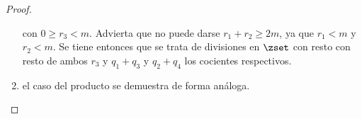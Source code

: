 \begin{proof}
\begin{enumerate}
      \noindent con $0 \geq r_3 < m$. Advierta que no puede darse $r_1 + r_2
      \geq 2m$, ya que $r_1 < m$ y $r_2 < m$. Se tiene entonces que se trata
      de divisiones en $\zset$ con resto con resto de ambos $r_3$ y $q_1 +
      q_3$ y $q_2 + q_4$ los cocientes respectivos.

    \item el caso del producto se demuestra de forma análoga.\qedhere
  \end{enumerate}
\end{proof}



